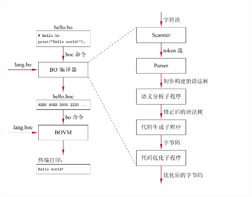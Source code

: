 \documentclass[dvipsnames, svgnames, x11names]{beamer}
\begin{document}

% 
\begin{frame}
    \begin{center}
        \includegraphics[height=\textheight]{../figure/compileProcess.pdf}
    \end{center}
\end{frame}
% 
\end{document}
